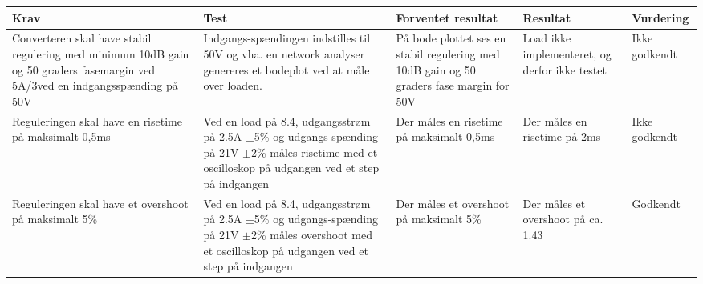 \begin{tabularx}{\textwidth}{|X|X|X|X|X|}
	\hline
	\textbf{Krav} & \textbf{Test} & \textbf{Forventet resultat} & \textbf{Resultat} & \textbf{Vurdering} \\ \hline
	Converteren skal have stabil regulering med minimum 10dB gain og 50 graders fasemargin ved 5A/3\ohm ved en indgangsspænding på 50V & Indgangs-spændingen indstilles til 50V og vha. en network analyser genereres et bodeplot ved at måle over loaden.& På bode plottet ses en stabil regulering med 10dB gain og 50 graders fase margin for 50V & Load ikke implementeret, og derfor ikke testet & Ikke godkendt\\ \hline
	Reguleringen skal have en risetime på maksimalt 0,5ms & Ved en load på 8.4\ohm, udgangsstrøm på 2.5A $\pm$5\% og udgangs-spænding på 21V $\pm$2\% måles risetime med et oscilloskop på udgangen ved et step på indgangen & Der måles en risetime på maksimalt 0,5ms & Der måles en risetime på 2ms & Ikke godkendt \\ \hline
	Reguleringen skal have et overshoot på maksimalt 5\% & Ved en load på 8.4\ohm, udgangsstrøm på 2.5A $\pm$5\% og udgangs-spænding på 21V $\pm$2\% måles overshoot med et oscilloskop på udgangen ved et step på indgangen & Der måles et overshoot på maksimalt 5\% & Der måles et overshoot på ca. 1.43\percent & Godkendt \\ \hline
\end{tabularx}